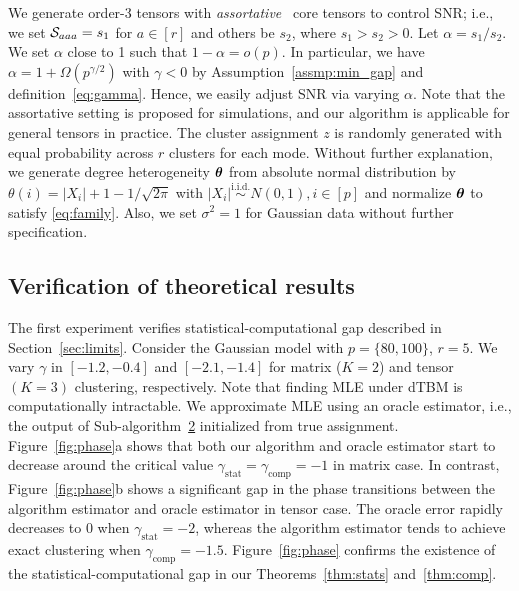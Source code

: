 \documentclass[lettersize,onecolumn,journal]{IEEEtran}
\theoremstyle{definition}
\theoremstyle{definition}
\begin{document}
We generate order-3 tensors with \emph{assortative}~\citep{gao2018community} core tensors to control SNR; i.e., we set $\mathcal{S}_{aaa} = s_1$ for $a \in [r]$ and others be $s_2$, where $s_1 > s_2 > 0$. Let $\alpha = s_1/s_2$. We set $\alpha$ close to 1 such that $1-\alpha=o(p)$. In particular, we have $\alpha = 1 + \Omega(p^{\gamma/2})$ with $\gamma<0$ by Assumption~\ref{assmp:min_gap} and definition~\eqref{eq:gamma}. Hence, we easily adjust SNR via varying $\alpha$. Note that the assortative setting is proposed for simulations, and our algorithm is applicable for general tensors in practice. The cluster assignment $z$ is randomly generated with equal probability across  $r$ clusters for each mode. Without further explanation, we generate degree heterogeneity $\boldsymbol{\theta}$ from absolute normal distribution by $\theta(i) = |X_i| + 1 - 1/\sqrt{2\pi}$ with $|X_i| \stackrel{\text{i.i.d.}}\sim N(0,1), i \in [p]$ and normalize $\boldsymbol{\theta}$ to satisfy \eqref{eq:family}. Also, we set $\sigma^2 = 1$ for Gaussian data without further specification. 

\subsection{Verification of theoretical results}\label{subsec:num_theory}

The first experiment verifies  statistical-computational gap described in Section~\ref{sec:limits}. Consider the Gaussian model with $p = \{80, 100\}$, $r = 5$. We vary $\gamma $ in $ [-1.2, -0.4]$ and $[-2.1, -1.4]$ for matrix ($K=2$) and tensor $(K = 3)$ clustering, respectively. Note that finding MLE under dTBM is computationally intractable. We approximate MLE using an oracle estimator, i.e., the output of Sub-algorithm~\hyperref[alg:main]{2} initialized from true assignment. Figure~\ref{fig:phase}a shows that both our algorithm and oracle estimator start to decrease around the critical value $\gamma_{\text{stat}}  = \gamma_{\text{comp}}  = -1$ in matrix case. In contrast, Figure~\ref{fig:phase}b shows a significant gap in the phase transitions between the algorithm estimator and oracle estimator in tensor case. The oracle error rapidly decreases to 0 when $\gamma_{\text{stat}} = -2$, whereas the algorithm estimator tends to achieve exact clustering when $\gamma_{\text{comp}} = -1.5$. Figure~\ref{fig:phase} confirms the existence of the statistical-computational gap in our Theorems~\ref{thm:stats} and~\ref{thm:comp}. 
\end{document}
